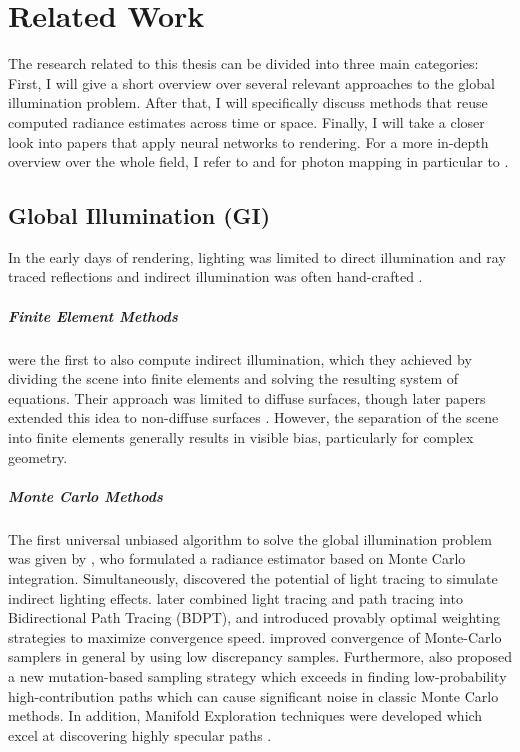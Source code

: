 
\chapter{Related Work}
\label{chap:related}
The research related to this thesis can be divided into three main categories:
First, I will give a short overview over several relevant approaches to the global illumination problem.
After that, I will specifically discuss methods that reuse computed radiance estimates across time or space.
Finally, I will take a closer look into papers that apply neural networks to rendering.
For a more in-depth overview over the whole field, I refer to \textcite{ritschel2012} and for photon mapping in particular to \textcite{kang2016}.

\section{Global Illumination (GI)}
In the early days of rendering, lighting was limited to direct illumination and ray traced reflections  and indirect illumination was often hand-crafted .

\paragraph{Finite Element Methods}
\textcite{goral1984} were the first to also compute indirect illumination, which they achieved by dividing the scene into finite elements and solving the resulting system of equations.
Their approach was limited to diffuse surfaces, though later papers extended this idea to non-diffuse surfaces .
However, the separation of the scene into finite elements generally results in visible bias, particularly for complex geometry.

\paragraph{Monte Carlo Methods}
The first universal unbiased algorithm to solve the global illumination problem was given by \textcite{kajiya1986}, who formulated a radiance estimator based on Monte Carlo integration.
Simultaneously, \textcite{arvo1986} discovered the potential of light tracing to simulate indirect lighting effects.
\textcite{lafortune1993} later combined light tracing and path tracing into Bidirectional Path Tracing (BDPT), and \textcite{veach1997} introduced provably optimal weighting strategies to maximize convergence speed.
\textcite{keller1995,owen1995} improved convergence of Monte-Carlo samplers in general by using low discrepancy samples.
Furthermore, \textcite{veach1997a} also proposed a new mutation-based sampling strategy which exceeds in finding low-probability high-contribution paths which can cause significant noise in classic Monte Carlo methods.
In addition, Manifold Exploration techniques were developed which excel at discovering highly specular paths .

